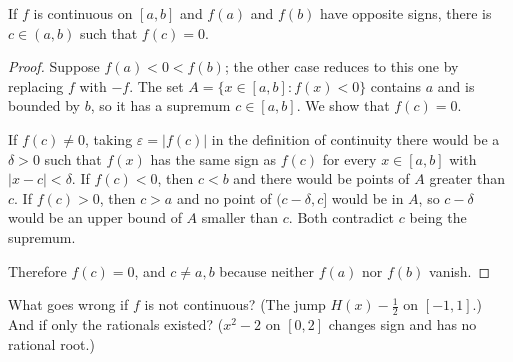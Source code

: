 
\begin{frame}

\begin{theorem}[Bolzano]
If $f$ is continuous on $[a, b]$ and $f(a)$ and $f(b)$ have opposite signs,
there is $c \in (a, b)$ such that $f(c) = 0$.
\end{theorem}


\begin{notesonly}
\begin{proof}
Suppose $f(a) < 0 < f(b)$; the other case reduces to this one by replacing $f$
with $-f$. The set $A = \{x \in [a, b] : f(x) < 0\}$ contains $a$ and is
bounded by $b$, so it has a supremum $c \in [a, b]$. We show that $f(c) = 0$.

If $f(c) \neq 0$, taking $\varepsilon = |f(c)|$ in the definition of
continuity there would be a $\delta > 0$ such that $f(x)$ has the same sign as
$f(c)$ for every $x \in [a, b]$ with $|x - c| < \delta$. If $f(c) < 0$,
then $c < b$ and there would be points of $A$ greater than $c$. If $f(c) > 0$,
then $c > a$ and no point of $(c - \delta, c]$ would be in $A$, so
$c - \delta$ would be an upper bound of $A$ smaller than $c$. Both contradict
$c$ being the supremum.

Therefore $f(c) = 0$, and $c \neq a, b$ because neither $f(a)$ nor $f(b)$ vanish.
\end{proof}
\end{notesonly}

\begin{teaching}[To discuss]
What goes wrong if $f$ is not continuous? (The jump $H(x) - \tfrac12$ on $[-1, 1]$.)
And if only
the rationals existed? ($x^2 - 2$ on $[0, 2]$ changes sign and has no
rational root.)
\end{teaching}
\end{frame}

